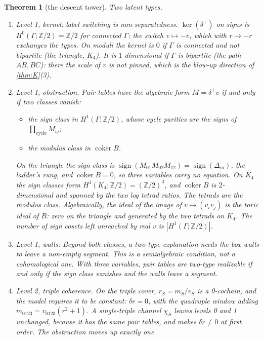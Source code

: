 \documentclass[11pt]{article}
\newtheorem{theorem}{Theorem}\renewcommand{\thetheorem}{\Alph{theorem}}
\theoremstyle{definition}\newtheorem{definition}{Definition}\newtheorem{remark}{Remark}
\begin{document}
\begin{theorem}[the descent tower]\label{thm:M}
Two latent types.
\begin{enumerate}
\item[(1)] \emph{Level 1, kernel: label switching is non-separatedness.} $\ker(\delta^+)$ on signs is $H^0(\Gamma;\mathbb Z/2)=\mathbb Z/2$
  for connected $\Gamma$: the switch $v\mapsto-v$, which with $r\mapsto-r$ exchanges the types. On moduli the kernel is $0$ if
  $\Gamma$ is connected and not bipartite (the triangle, $K_4$). It is $1$-dimensional if $\Gamma$ is bipartite (the path
  $AB,BC$): there the scale of $v$ is not pinned, which is the blow-up direction of \cref{thm:K}(3).
\item[(2)] \emph{Level 1, obstruction.} Pair tables have the algebraic form $M=\delta^+v$ if and only if two classes vanish:
  \begin{itemize}
  \item the \emph{sign class} in $H^1(\Gamma;\mathbb Z/2)$, whose cycle parities are the signs of $\prod_{\text{cycle}}M_{ij}$;
  \item the \emph{modulus class} in $\operatorname{coker}B$.
  \end{itemize}
  On the triangle the sign class is $\operatorname{sign}(M_{01}M_{02}M_{12})=\operatorname{sign}(\Delta_m)$, the ladder's rung, and
  $\operatorname{coker}B=0$, so three variables carry no equation. On $K_4$ the sign classes form $H^1(K_4;\mathbb Z/2)=(\mathbb Z/2)^3$,
  and $\operatorname{coker}B$ is $2$-dimensional and spanned by the two log tetrad ratios. \emph{The tetrads are the modulus class.}
  Algebraically, the ideal of the image of $v\mapsto(v_iv_j)$ is the toric ideal of $B$: zero on the triangle and generated by the two
  tetrads on $K_4$. The number of sign cosets left unreached by real $v$ is $|H^1(\Gamma;\mathbb Z/2)|$.
\item[(3)] \emph{Level 1, walls.} Beyond both classes, a two-type explanation needs the box walls to leave a non-empty segment. This is a
  semialgebraic condition, not a cohomological one. With three variables, pair tables are two-type realizable if and only if the sign
  class vanishes and the walls leave a segment.
\item[(4)] \emph{Level 2, triple coherence.} On the triple cover, $r_S=m_S/v_S$ is a 0-cochain, and the model requires it to be
  constant: $\delta r=0$, with the quadruple window adding $m_{0123}=v_{0123}(r^2+1)$. A single-triple channel $\chi_S$ leaves levels 0
  and 1 unchanged, because it has the same pair tables, and makes $\delta r\ne0$ at first order. The obstruction moves up exactly one

\end{enumerate}
\end{theorem}
\end{document}
